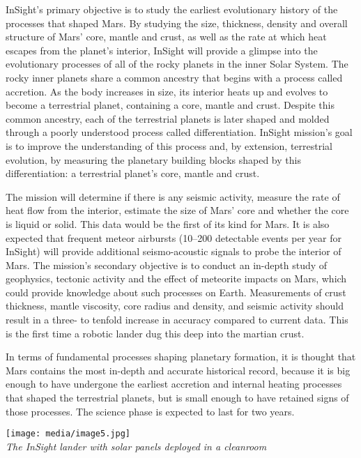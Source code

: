 InSight's primary objective is to study the earliest evolutionary
history of the processes that shaped Mars. By studying the size,
thickness, density and overall structure of Mars' core, mantle and
crust, as well as the rate at which heat escapes from the planet's
interior, InSight will provide a glimpse into the evolutionary processes
of all of the rocky planets in the inner Solar System. The rocky inner
planets share a common ancestry that begins with a process called
accretion. As the body increases in size, its interior heats up and
evolves to become a terrestrial planet, containing a core, mantle and
crust. Despite this common ancestry, each of the terrestrial planets is
later shaped and molded through a poorly understood process called
differentiation. InSight mission's goal is to improve the understanding
of this process and, by extension, terrestrial evolution, by measuring
the planetary building blocks shaped by this differentiation: a
terrestrial planet's core, mantle and crust.

The mission will determine if there is any seismic activity, measure the
rate of heat flow from the interior, estimate the size of Mars' core and
whether the core is liquid or solid. This data would be the first of its
kind for Mars. It is also expected that frequent meteor airbursts
(10--200 detectable events per year for InSight) will provide additional
seismo-acoustic signals to probe the interior of Mars. The mission's
secondary objective is to conduct an in-depth study of geophysics,
tectonic activity and the effect of meteorite impacts on Mars, which
could provide knowledge about such processes on Earth. Measurements of
crust thickness, mantle viscosity, core radius and density, and seismic
activity should result in a three- to tenfold increase in accuracy
compared to current data. This is the first time a robotic lander dug
this deep into the martian crust.

In terms of fundamental processes shaping planetary formation, it is
thought that Mars contains the most in-depth and accurate historical
record, because it is big enough to have undergone the earliest
accretion and internal heating processes that shaped the terrestrial
planets, but is small enough to have retained signs of those processes.
The science phase is expected to last for two years.

\texttt{[image: media/image5.jpg]}\\
\emph{The InSight lander with solar panels deployed in a cleanroom}

